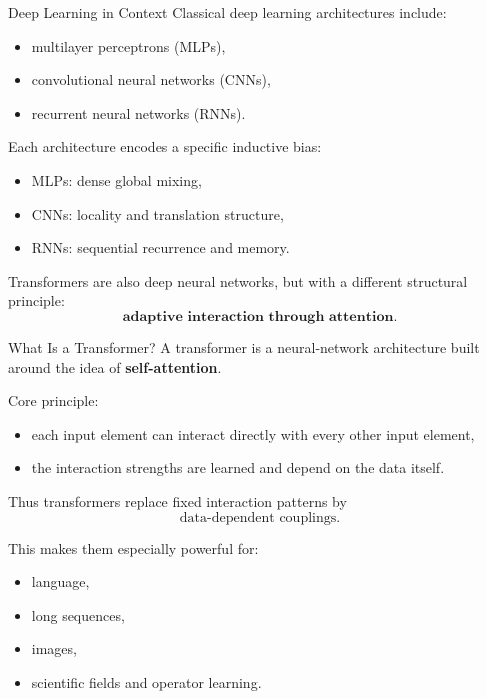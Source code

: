 \documentclass{beamer}
\begin{document}
\begin{frame}{Deep Learning in Context}
Classical deep learning architectures include:
\begin{itemize}
\item multilayer perceptrons (MLPs),
\item convolutional neural networks (CNNs),
\item recurrent neural networks (RNNs).
\end{itemize}

Each architecture encodes a specific inductive bias:
\begin{itemize}
\item MLPs: dense global mixing,
\item CNNs: locality and translation structure,
\item RNNs: sequential recurrence and memory.
\end{itemize}

Transformers are also deep neural networks, but with a different structural principle:
\[
\textbf{adaptive interaction through attention.}
\]
\end{frame}
\begin{frame}{What Is a Transformer?}
  A transformer is a neural-network architecture built around the idea of
  \textbf{self-attention}.

  Core principle:
  \begin{itemize}
  \item each input element can interact directly with every other input element,
  \item the interaction strengths are learned and depend on the data itself.
  \end{itemize}

  Thus transformers replace fixed interaction patterns by
  \[
  \text{data-dependent couplings}.
  \]

  This makes them especially powerful for:
  \begin{itemize}
  \item language,
  \item long sequences,
  \item images,
  \item scientific fields and operator learning.
  \end{itemize}
\end{frame}
\end{document}
